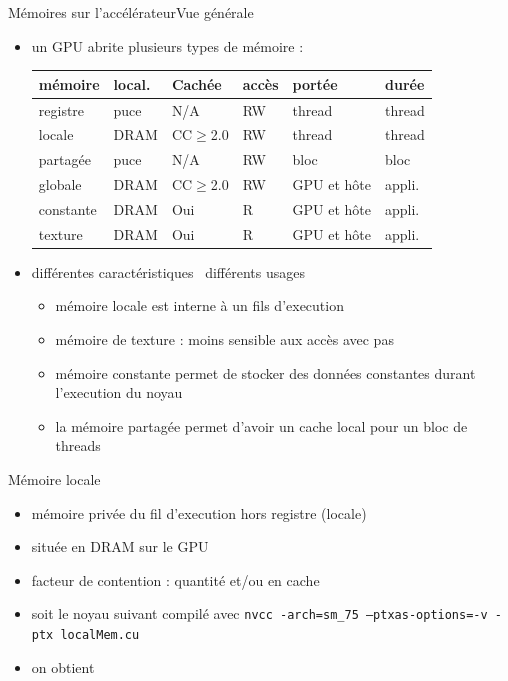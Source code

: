 \documentclass[11pt,mathserif]{beamer}
\newcommand{\scout}{\faAngellist}
\newcommand{\gezi}{\faLongArrowRight}
\newcommand{\hand}{\faHandORight}
\newcommand{\argi}{\faLightbulbO}
\newcommand{\kontuz}{\faExclamationTriangle}
\newcommand{\adibi}{\faCommentO}
\begin{document}
\begin{frame}{Mémoires sur l'accélérateur}{Vue générale}
  \begin{itemize}[<+->]
    \item[\argi] un GPU abrite plusieurs types de mémoire : 
\begin{tabular}{|l|l|l|l|l|l|}
  \hline
  mémoire   & local. & Cachée  & accès     & portée   & durée \\ 
  \hline
  registre  & puce  &  N/A   & RW & thread & thread \\
  locale    & DRAM  & CC$\geqslant$2.0 & RW & thread & thread \\
  partagée  & puce  & N/A    & RW & bloc   & bloc \\
  globale   & DRAM  & CC$\geqslant$2.0  & RW & GPU et hôte &  appli. \\
  constante & DRAM  & Oui    & R  & GPU et hôte &  appli. \\
  texture   & DRAM  & Oui    & R  & GPU et hôte &  appli. \\
  \hline
\end{tabular}
  \item[\kontuz] différentes caractéristiques \gezi\ différents usages
    \begin{itemize} 
     \item mémoire locale est interne à un fils d'execution
     \item mémoire de texture : moins sensible aux accès avec pas
     \item mémoire constante permet de stocker des données constantes durant l'execution du noyau
     \item la mémoire partagée permet d'avoir un cache local pour un bloc de threads
  \end{itemize}
  \end{itemize}
\end{frame}
\begin{frame}{Mémoire locale}
  \begin{itemize}[<+->]
    \item[\scout] mémoire privée du fil d'execution hors registre (locale)
    \item[\argi] située en DRAM sur le GPU
    \item[\kontuz] facteur de contention : quantité et/ou en cache
    \item[\adibi] soit le noyau suivant compilé avec \texttt{nvcc -arch=sm\_75 --ptxas-options=-v -ptx  localMem.cu}

     \item[\hand] on obtient

   \end{itemize}
\end{frame}
\end{document}
